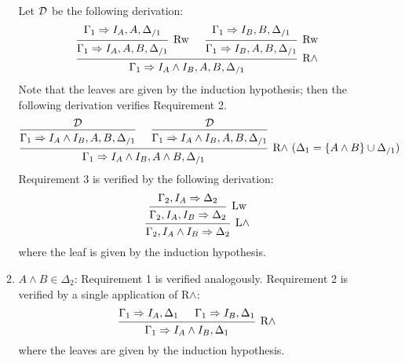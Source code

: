 \documentclass[a4paper]{article}
\begin{document}
\begin{itemize}
\begin{enumerate}
    Let $\mathcal{D}$ be the following derivation:
    \[
      \begin{prooftree}
        \hypo{\Gamma_1 \Rightarrow I_A,A,\Delta_{/1}}
        \infer1[Rw]{\Gamma_1 \Rightarrow I_A,A,B,\Delta_{/1}}
        \hypo{\Gamma_1 \Rightarrow I_B,B,\Delta_{/1}}
        \infer1[Rw]{\Gamma_1 \Rightarrow I_B,A,B,\Delta_{/1}}
        \infer2[R$\wedge$]{\Gamma_1 \Rightarrow I_A \wedge I_B,A,B,\Delta_{/1}}
      \end{prooftree}
    \]
    Note that the leaves are given by the induction hypothesis; then the following derivation verifies Requirement 2.
    \begin{align*}
      \begin{prooftree}
        \hypo{\cD}
        \infer1{\Gamma_1 \Rightarrow I_A \wedge I_B,A,B,\Delta_{/1}}
        \hypo{\cD}
        \infer1{\Gamma_1 \Rightarrow I_A \wedge I_B,A,B,\Delta_{/1}}
        \infer2[R$\wedge$ ($\Delta_1 = \{A \wedge B\} \cup \Delta_{/1}$)]{\Gamma_1 \Rightarrow I_A \wedge I_B, A \wedge B, \Delta_{/1}}
      \end{prooftree}
    \end{align*}
    Requirement 3 is verified by the following derivation:
    \[
      \begin{prooftree}
        \hypo{\Gamma_2,I_A \Rightarrow \Delta_2}
        \infer1[Lw]{\Gamma_2,I_A,I_B \Rightarrow \Delta_2}
        \infer1[L$\wedge$]{\Gamma_2,I_A\wedge I_B \Rightarrow \Delta_2}
      \end{prooftree}
    \]
    where the leaf is given by the induction hypothesis.
  \item $A \wedge B \in \Delta_2$: Requirement 1 is verified analogously.
    Requirement 2 is verified by a single application of R$\wedge$:
    \[
      \begin{prooftree}
        \hypo{\Gamma_1 \Rightarrow I_A,\Delta_1}
        \hypo{\Gamma_1 \Rightarrow I_B,\Delta_1}
        \infer2[R$\wedge$]{\Gamma_1 \Rightarrow I_A \wedge I_B,\Delta_1}
      \end{prooftree}
    \]
    where the leaves are given by the induction hypothesis.
    

\end{enumerate}
\end{itemize}
\end{document}
